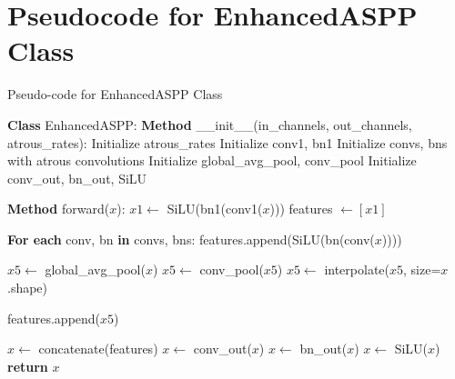 \documentclass[conference]{IEEEtran}
\begin{document}
\section{Pseudocode for EnhancedASPP Class}
\begin{algorithm}[H]
\caption{Pseudo-code for EnhancedASPP Class}\label{alg:enhanced_aspp}
\begin{algorithmic}[1]
\State \textbf{Class} EnhancedASPP:
\State \hspace{0.5cm} \textbf{Method} \_\_init\_\_(in\_channels, out\_channels, atrous\_rates):
\State \hspace{1cm} Initialize atrous\_rates
\State \hspace{1cm} Initialize conv1, bn1
\State \hspace{1cm} Initialize convs, bns with atrous convolutions
\State \hspace{1cm} Initialize global\_avg\_pool, conv\_pool
\State \hspace{1cm} Initialize conv\_out, bn\_out, SiLU

\State \hspace{0.5cm} \textbf{Method} forward($x$):
\State \hspace{1cm} $x1 \gets$ SiLU(bn1(conv1($x$)))
\State \hspace{1cm} features $\gets [x1]$

\State \hspace{1cm} \textbf{For each} conv, bn \textbf{in} convs, bns:
\State \hspace{1.5cm} features.append(SiLU(bn(conv($x$))))

\State \hspace{1cm} $x5 \gets$ global\_avg\_pool($x$)
\State \hspace{1cm} $x5 \gets$ conv\_pool($x5$)
\State \hspace{1cm} $x5 \gets$ interpolate($x5$, size=$x$.shape)

\State \hspace{1cm} features.append($x5$)

\State \hspace{1cm} $x \gets$ concatenate(features)
\State \hspace{1cm} $x \gets$ conv\_out($x$)
\State \hspace{1cm} $x \gets$ bn\_out($x$)
\State \hspace{1cm} $x \gets$ SiLU($x$)
\State \hspace{1cm} \textbf{return} $x$
\end{algorithmic}
\end{algorithm}
\end{document}
